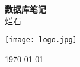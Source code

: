\documentclass[UTF8,a4paper,12pt,autoindent=true,fontset=none,zihao=-4,scheme=chinese,space=auto]{ctexart}
\begin{document}
\begin{titlepage}
    \centering %
    \vspace{2cm} %
    {\Huge \textbf{数据库笔记}} \\
    \vspace{1.5cm}
    {\Large 烂石} \\
    \vspace{2cm}
    \begin{flushleft}
        \centering %
        \texttt{[image: logo.jpg]} %
    \end{flushleft}
    \vfill
    {\large \today}
\end{titlepage}










\end{document}
